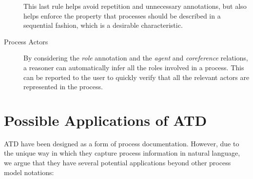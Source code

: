 \begin{description}
{    This last rule helps avoid repetition and unnecessary annotations, but also
    helps enforce the property that processes should be described in a
    sequential fashion, which is a desirable characteristic.}
  \item[Process Actors]{By considering the \emph{role} annotation and the
      \emph{agent} and \emph{coreference} relations, a reasoner can
      automatically infer all the roles involved in a process. This can be
      reported to the user to quickly verify that all the relevant actors are
      represented in the process.}
\end{description}

\section{Possible Applications of ATD}
\label{sec:atd_applications}

ATD have been designed as a form of process documentation. However, due to the
unique way in which they capture process information in natural language, we
argue that they have several potential applications beyond other process
model notations:


